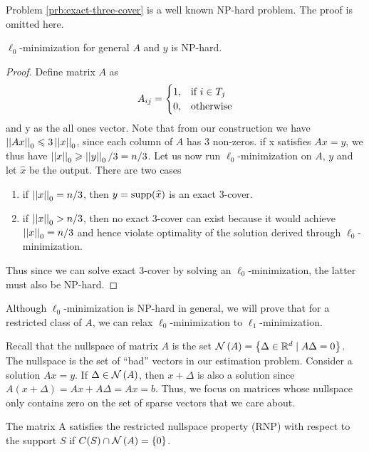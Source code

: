 \documentclass[11pt]{article}
\begin{document}
\begin{problem}
\begin{remark}
    Problem \ref{prb:exact-three-cover} is a well known NP-hard problem. The proof is omitted here.
\end{remark}

\begin{theorem}
    \(\ell_0\)-minimization for general \(A\) and \(y\) is NP-hard.
\end{theorem}
\begin{proof}
    Define matrix \(A\) as
    \[A_{ij}=\begin{cases}
        1, & \text{if } i \in T_j\\
        0, & \textnormal{otherwise}
    \end{cases}\]
    and y as the all ones vector. Note that from our construction we have \(\left|\left|Ax\right|\right|_0 \leqslant 3\left|\left|x\right|\right|_0\), since each column of \(A\) has 3 non-zeros. if x satisfies \(Ax=y\), we thus have \(\left|\left|x\right|\right|_0 \geqslant \left|\left|y\right|\right|_0/3 = n/3\). Let us now run \(\ell_0\)-minimization on \(A\), \(y\) and let \(\widehat{x}\) be the output. There are two cases
    \begin{enumerate}
        \item if \(\left|\left|x\right|\right|_0 = n/3\), then \(y = \operatorname{supp}(\widehat{x})\) is an exact 3-cover.
        \item if \(\left|\left|x\right|\right|_0 > n/3\), then no exact 3-cover can exist because it would achieve \(\left|\left|x\right|\right|_0 = n/3\) and hence violate optimality of the solution derived through \(\ell_0\)-minimization.
    \end{enumerate}
    Thus since we can solve exact 3-cover by solving an \(\ell_0\)-minimization, the latter must also be NP-hard.
\end{proof}

Although \(\ell_0\)-minimization is NP-hard in general, we will prove that for a restricted class of \(A\), we can relax \(\ell_0\)-minimization to \(\ell_1\)-minimization.

Recall that the nullspace of matrix \(A\) is the set \(\mathcal N\left(A\right)=\left\{\Delta \in\mathbb R^d \mid A \Delta=0\right\}\). The nullspace is the set of ``bad'' vectors in our estimation problem. Consider a solution \(A x=y\). If \(\Delta \in\mathcal N\left(A\right)\), then \(x+\Delta\) is also a solution since \(A(x+\Delta)=A x+A \Delta= A x=b\). Thus, we focus on matrices whose nullspace only contains zero on the set of sparse vectors that we care about.

\begin{definition}
    The matrix A satisfies the restricted nullspace property (RNP) with respect to the support \(S\) if \(C(S) \cap \mathcal N\left(A\right)=\{0\}\).
\end{definition} 


\end{problem}
\end{document}
